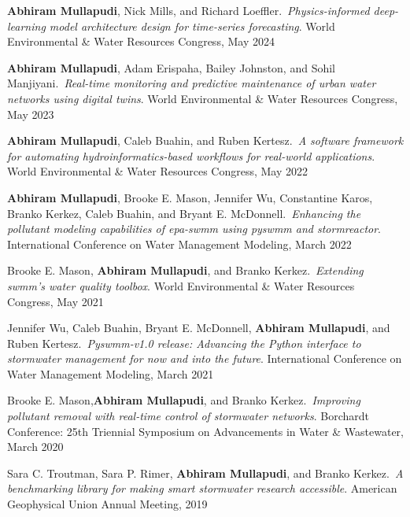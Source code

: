 \documentclass[a4paper,11pt]{article}
\newcommand{\years}[1]{%
  {\reversemarginpar\strut\marginnote{{\small#1}}}%
}
\begin{document}
\years{2024} \textbf{Abhiram Mullapudi}, Nick Mills, and Richard Loeffler.\ \emph{Physics-informed deep-learning model architecture design for time-series forecasting}.  World Environmental \& Water Resources Congress, May 2024\\[.1cm]

\years{2023} \textbf{Abhiram Mullapudi}, Adam Erispaha, Bailey Johnston, and Sohil Manjiyani.\ \emph{Real-time monitoring and predictive maintenance of urban water networks using digital twins}. World Environmental \& Water Resources Congress, May 2023\\[.1cm]

\years{2022} \textbf{Abhiram Mullapudi}, Caleb Buahin, and Ruben Kertesz.\ \emph{A software framework for automating hydroinformatics-based workflows for real-world applications}. World Environmental \& Water Resources Congress, May 2022\\[.1cm]

\years{2022} \textbf{Abhiram Mullapudi}, Brooke E. Mason, Jennifer Wu, Constantine Karos, Branko
Kerkez, Caleb Buahin, and Bryant E. McDonnell.\ \emph{Enhancing the pollutant modeling capabilities of epa-swmm using pyswmm and stormreactor}. International Conference on Water Management Modeling, March 2022\\[.1cm]

\years{2021} Brooke E. Mason, \textbf{Abhiram Mullapudi}, and Branko Kerkez.\ \emph{Extending swmm’s water quality toolbox}. World Environmental \& Water Resources Congress, May 2021\\[.1cm]

\years{2021} Jennifer Wu, Caleb Buahin, Bryant E. McDonnell, \textbf{Abhiram Mullapudi}, and Ruben Kertesz.\ \emph{Pyswmm-v1.0 release: Advancing the Python interface to stormwater management for now and into the future}. International Conference on Water Management Modeling, March 2021\\[.1cm]

\years{2020} Brooke E. Mason,\textbf{Abhiram Mullapudi}, and Branko Kerkez.\ \emph{Improving pollutant removal with real-time control of stormwater networks}. Borchardt Conference: 25th Triennial Symposium on Advancements in Water \& Wastewater, March 2020\\[.1cm]

\years{2019} Sara C. Troutman, Sara P. Rimer, \textbf{Abhiram Mullapudi}, and Branko Kerkez.\ \emph{A benchmarking library for making smart stormwater research accessible}. American Geophysical Union Annual Meeting, 2019\\[.1cm]
\end{document}
